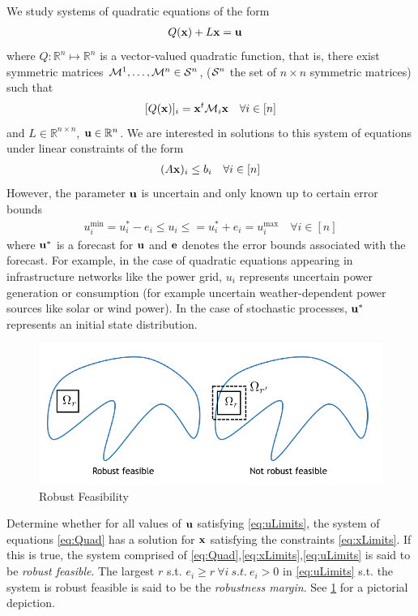 
We study systems of quadratic equations of the form
\begin{align}
& Q(\bold x)+L\bold x=\bold u\label{eq:Quad}
\end{align}
where $Q: \mathbb{R}^n \mapsto \mathbb{R}^n$ is a vector-valued quadratic function, that is, there exist symmetric matrices $\mathcal{M}^1,\ldots,\mathcal{M}^{n} \in \mathcal{S}^{n}$, ($\mathcal{S}^{n}$ the set of $n \times n$ symmetric matrices) such that
\[[Q(\bold x)]_i = \bold x^t \mathcal{M}_{i} \bold x \quad \forall i \in [n]\]
and $L \in \mathbb{R}^{n\times n}$, $\bold u \in \mathbb{R}^n$. 
We are interested in solutions to this system of equations under linear constraints of the form
\begin{align}
(A\bold x)_i\leq b_i \quad \forall i \in [n]\label{eq:xLimits}
\end{align}
However, the parameter $\bold u$ is uncertain and only known up to certain error bounds
\begin{align}
u^{\min}_i=u_i^*-e_i \leq u_i \leq =u_i^*+e_i=u^{\max}_i \quad \forall i \in [n] \label{eq:uLimits}
\end{align}
where $\bold u^*$ is a forecast for $\bold u$ and $\bold e$ denotes the error bounds associated with the forecast. 
For example, in the case of quadratic equations appearing in infrastructure networks like the power grid, $u_i$ represents uncertain power generation or consumption (for example uncertain weather-dependent power sources like solar or wind power). 
In the case of stochastic processes, $\bold u^*$ represents an initial state distribution.

\begin{figure}
\begin{center}
\includegraphics[scale=0.5]{Figures/Rfeas}
\end{center}
\caption{Robust Feasibility}
\label{fig:RFeas}
\end{figure}

\begin{cdef}
\label{RobustDef}
Determine whether for all values of $\bold u$ satisfying \eqref{eq:uLimits}, the system of equations \eqref{eq:Quad} has a solution for $\bold x$ satisfying the constraints \eqref{eq:xLimits}. 
If this is true, the system comprised of \eqref{eq:Quad},\eqref{eq:xLimits},\eqref{eq:uLimits} is said to be \emph{robust feasible}. 
The largest $r$ s.t. $e_i\geq r \ \forall i \ s.t. \ e_i>0$ in \eqref{eq:uLimits} s.t. the system is robust feasible is said to be the \emph{robustness margin}. 
See \cref{fig:RFeas} for a pictorial depiction. 
\end{cdef}

